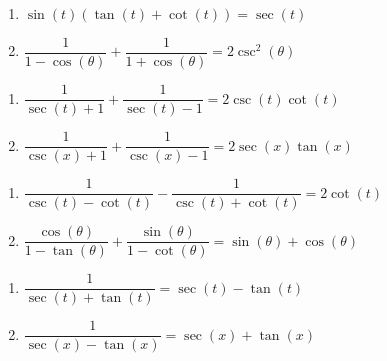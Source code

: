 \documentclass{ximera}
\begin{document}
\begin{multicols}{2}

\begin{enumerate}

\setcounter{enumi}{\value{HW}}

\item $\sin(t)(\tan(t) + \cot(t)) = \sec(t)$ 
\item   $\dfrac{1}{1-\cos(\theta)} + \dfrac{1}{1+\cos(\theta)} = 2\csc^{2}(\theta)$

\setcounter{HW}{\value{enumi}}

\end{enumerate}

\end{multicols}

\begin{multicols}{2}

\begin{enumerate}

\setcounter{enumi}{\value{HW}}

\item  $\dfrac{1}{\sec(t) + 1} + \dfrac{1}{\sec(t)-1} = 2 \csc(t) \cot(t)$
\item  $\dfrac{1}{\csc(x) + 1} + \dfrac{1}{\csc(x)-1} = 2 \sec(x) \tan(x)$

\setcounter{HW}{\value{enumi}}

\end{enumerate}

\end{multicols}

\begin{multicols}{2}

\begin{enumerate}

\setcounter{enumi}{\value{HW}}
\small
\item $\dfrac{1}{\csc(t)-\cot(t)} - \dfrac{1}{\csc(t) + \cot(t)} = 2 \cot(t)$
\item $\dfrac{\cos(\theta)}{1 - \tan(\theta)} + \dfrac{\sin(\theta)}{1 - \cot(\theta)} = \sin(\theta) + \cos(\theta)$
\normalsize
\setcounter{HW}{\value{enumi}}

\end{enumerate}

\end{multicols}

\begin{multicols}{2}

\begin{enumerate}

\setcounter{enumi}{\value{HW}}

\item $\dfrac{1}{\sec(t) + \tan(t)} = \sec(t) - \tan(t)$
\item  $\dfrac{1}{\sec(x) - \tan(x)} = \sec(x) + \tan(x)$

\setcounter{HW}{\value{enumi}}

\end{enumerate}

\end{multicols}
\end{document}
